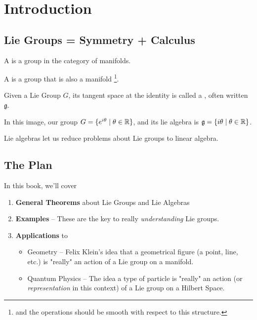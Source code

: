 \documentclass[../main.tex]{subfiles}
\begin{document}
\chapter{Introduction}%
\label{ch:introduction}


\section{Lie Groups = Symmetry + Calculus}
  
\begin{defn}
  A  is a group in the category of manifolds.
\end{defn}

\begin{defn}
  A  is a group that is also a manifold%
  \footnote{and the operations should be smooth with respect to this structure.}.
\end{defn}

Given a Lie Group $G$, its tangent space at the identity is called a 
, often written $\mathfrak{g}$.


In this image, our group $G = \{ e^{i \theta} \mid \theta \in \mathbb{R} \}$,
and its lie algebra is $\mathfrak{g} = \{ i \theta \mid \theta \in \mathbb{R} \}$.

Lie algebras let us reduce problems about Lie groups to linear algebra.

\section{The Plan}

In this book, we'll cover

\begin{enumerate}
  \item \textbf{General Theorems} about Lie Groups and Lie Algebras 
  \item \textbf{Examples} -- These are the key to really \emph{understanding} Lie groups.
  \item \textbf{Applications} to 
    \begin{itemize}
      \item Geometry -- Felix Klein's idea 
        that a geometrical figure (a point, line, etc.) is "really" an action of a Lie group on a manifold.
      \item Quantum Physics -- The idea  a type of particle
        is "really" an action (or \emph{representation} in this context) of a Lie group on a Hilbert Space.
    \end{itemize}
\end{enumerate}
\end{document}
